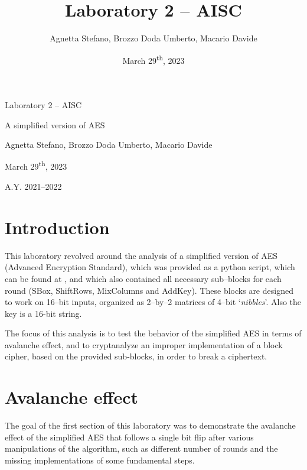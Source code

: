 \documentclass[12pt]{article}
\title{Laboratory 2 – AISC}
\author{Agnetta Stefano, Brozzo Doda Umberto, Macario Davide}
\date{March 29\textsuperscript{th}, 2023}
\newcommand\titleofdoc{Laboratory 2 – AISC} %
\newcommand\GroupName{Agnetta Stefano, Brozzo Doda Umberto, Macario Davide}
\newcommand\CurrDate{March 29\textsuperscript{th}, 2023}
\begin{document}
\begin{titlepage}
   \begin{center}
        \vspace*{4cm} %

        \Huge{\titleofdoc} 

        \vspace{0.5cm}
        \LARGE{A simplified version of AES}
            
        \vspace{3 cm}
        \Large{\GroupName\\}
       
        \vspace{4 cm}
       
        \vspace{4 cm}
        \Large{\CurrDate}
        
        \vspace{0.25 cm}
        \Large{A.Y. 2021–2022}
       
       \vfill
    \end{center}
\end{titlepage}

\section{Introduction}
\label{sec:01}

This laboratory revolved around the analysis of a simplified version of AES (Advanced Encryption Standard), which was provided as a python script, which can be found at \cite{Original Python implementation}, and which also contained all necessary sub–blocks for each round (SBox, ShiftRows, MixColumns and AddKey).
These blocks are designed to work on 16–bit inputs, organized as 2–by–2 matrices of 4–bit `\textit{nibbles}'. Also the key is a 16-bit string.

The focus of this analysis is to test the behavior of the simplified AES in terms of avalanche effect, and to cryptanalyze an improper implementation of a block cipher, based on the provided sub-blocks, in order to break a ciphertext.

\section{Avalanche effect}
\label{sec:02}

The goal of the first section of this laboratory was to demonstrate the avalanche effect of the simplified AES that follows a single bit flip after various manipulations of the algorithm, such as different number of rounds and the missing implementations of some fundamental steps.
\end{document}

